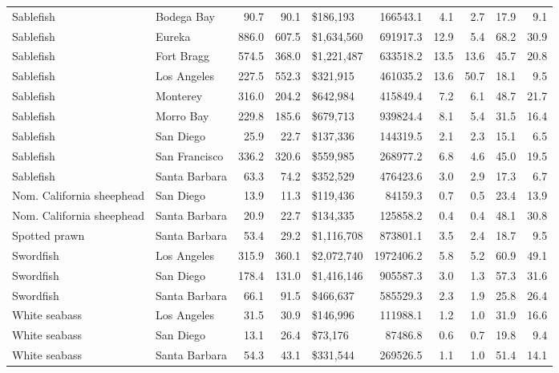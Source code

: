 \documentclass[
  letterpaper,
  DIV=11,
  numbers=noendperiod]{scrartcl}
\begin{document}
\begin{table}
{\begin{tabular}{llrrlrrrrr}
Sablefish & Bodega Bay & 90.7 & 90.1 & \$186,193 & 166543.1 & 4.1 & 2.7 & 17.9 & 9.1\\
Sablefish & Eureka & 886.0 & 607.5 & \$1,634,560 & 691917.3 & 12.9 & 5.4 & 68.2 & 30.9\\
Sablefish & Fort Bragg & 574.5 & 368.0 & \$1,221,487 & 633518.2 & 13.5 & 13.6 & 45.7 & 20.8\\
\addlinespace
Sablefish & Los Angeles & 227.5 & 552.3 & \$321,915 & 461035.2 & 13.6 & 50.7 & 18.1 & 9.5\\
Sablefish & Monterey & 316.0 & 204.2 & \$642,984 & 415849.4 & 7.2 & 6.1 & 48.7 & 21.7\\
Sablefish & Morro Bay & 229.8 & 185.6 & \$679,713 & 939824.4 & 8.1 & 5.4 & 31.5 & 16.4\\
Sablefish & San Diego & 25.9 & 22.7 & \$137,336 & 144319.5 & 2.1 & 2.3 & 15.1 & 6.5\\
Sablefish & San Francisco & 336.2 & 320.6 & \$559,985 & 268977.2 & 6.8 & 4.6 & 45.0 & 19.5\\
\addlinespace
Sablefish & Santa Barbara & 63.3 & 74.2 & \$352,529 & 476423.6 & 3.0 & 2.9 & 17.3 & 6.7\\
Nom. California sheephead & San Diego & 13.9 & 11.3 & \$119,436 & 84159.3 & 0.7 & 0.5 & 23.4 & 13.9\\
Nom. California sheephead & Santa Barbara & 20.9 & 22.7 & \$134,335 & 125858.2 & 0.4 & 0.4 & 48.1 & 30.8\\
Spotted prawn & Santa Barbara & 53.4 & 29.2 & \$1,116,708 & 873801.1 & 3.5 & 2.4 & 18.7 & 9.5\\
Swordfish & Los Angeles & 315.9 & 360.1 & \$2,072,740 & 1972406.2 & 5.8 & 5.2 & 60.9 & 49.1\\
\addlinespace
Swordfish & San Diego & 178.4 & 131.0 & \$1,416,146 & 905587.3 & 3.0 & 1.3 & 57.3 & 31.6\\
Swordfish & Santa Barbara & 66.1 & 91.5 & \$466,637 & 585529.3 & 2.3 & 1.9 & 25.8 & 26.4\\
White seabass & Los Angeles & 31.5 & 30.9 & \$146,996 & 111988.1 & 1.2 & 1.0 & 31.9 & 16.6\\
White seabass & San Diego & 13.1 & 26.4 & \$73,176 & 87486.8 & 0.6 & 0.7 & 19.8 & 9.4\\
White seabass & Santa Barbara & 54.3 & 43.1 & \$331,544 & 269526.5 & 1.1 & 1.0 & 51.4 & 14.1\\
\bottomrule
\end{tabular}}
\end{table}
\end{document}
